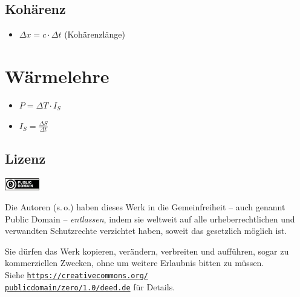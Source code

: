\documentclass[paper = a4, twocolumn]{scrartcl}
\DeclareRobustCommand{\E}{\mathcal{E}}
\begin{document}
\subsection{Kohärenz}
\begin{itemize}
\item
	\( \Delta x = c \cdot \Delta t \) (Kohärenzlänge)
\end{itemize}

\section{Wärmelehre}
\begin{itemize}
\itemb{
	\( \Delta S = \frac{\Delta \E}{T} \)
}
\item
	\( P = \Delta T \cdot I_S \)
\item
	\( I_S = \frac{\Delta S}{\Delta t} \)
\end{itemize}

\begin{appendix}
\section{Lizenz}
\includegraphics[width = 1.5cm]{cc0.png}

Die Autoren (s.\,o.) haben dieses Werk in die Gemeinfreiheit -- auch genannt
Public Domain -- \emph{entlassen}, indem sie weltweit auf alle
urheberrechtlichen und verwandten Schutzrechte verzichtet haben, soweit das
gesetzlich möglich ist.

Sie dürfen das Werk kopieren, verändern, verbreiten und aufführen, sogar zu
kommerziellen Zwecken, ohne um weitere Erlaubnis bitten zu müssen.
\\Siehe \href{https://creativecommons.org/publicdomain/zero/1.0/deed.de}
{\texttt{https://creativecommons.org/\\publicdomain/zero/1.0/deed.de}} für
Details.
\end{appendix}
\end{document}
